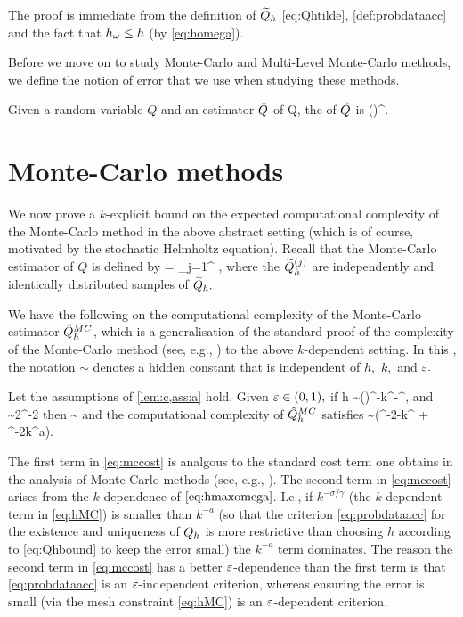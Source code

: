 The proof is immediate from the definition of $\widetilde{Q}_{h}$ \cref{eq:Qhtilde}, \cref{def:probdataacc} and the fact that $h_{\omega} \leq h$ (by \cref{eq:homega}).
\epf

Before we move on to study Monte-Carlo and Multi-Level Monte-Carlo methods, we define the notion of error that we use when studying these methods.

\label{def:rmse}
Given a random variable $Q$ and an estimator $\hat{Q}$ of Q, the  of $\hat{Q}$ is
\beqs
\err{\Qhat} \de \mleft(\mright)^{\half}.
\eeqs
\ede

\section{Monte-Carlo methods}\label{sec:mc}

We now prove a $k$-explicit bound on the expected computational complexity of the Monte-Carlo method in the above abstract setting (which is of course, motivated by the stochastic Helmholtz equation). Recall that the Monte-Carlo estimator of $Q$ is defined by
\beqs
\QhatMC =  \sum_{j=1}^{\NMC} \Qhtildesj,
\eeqs
where the $\widetilde{Q}_{h}^{(j)}$ are independently and identically distributed samples of $\widetilde{Q}_{h}.$

We have the following  on the computational complexity of the Monte-Carlo estimator $\hat{Q}^{MC}_{h}$, which is a generalisation of the standard proof of the complexity of the Monte-Carlo method (see, e.g., \cite[Section 2.1]{ClGiScTe:11}) to the above $k$-dependent setting. In this , the notation $\sim$ denotes a hidden constant that is independent of $h,$ $k,$ and $\varepsilon.$

\label{thm:hhmc}
Let the assumptions of \cref{lem:c,ass:a} hold. Given $\varepsilon \in (0,1),$ if
\beq\label{eq:hMC}
h \sim \mleft(\co\mright)^{-}k^{-\frac\sigma\alpha}\eps^{},
\eeq
and
\beq\label{eq:NMC}
\NMC  \sim 2\VAR{\Qhtilde}\eps^{-2}
\eeq
then
\beq\label{eq:mcerror}
\err{\QhatMC} \sim \eps
\eeq
and the computational complexity of $\hat{Q}^{MC}_{h}$ satisfies
\beq\label{eq:mccost}
\EXP{\CMC} \sim \VAR{\Qhtilde}\mleft(\eps^{-2-\frac{\gamma}{\alpha}}k^{\frac{\gamma\sigma}\alpha} + \eps^{-2}k^{a\gamma}\mright).
\eeq
\enth

The first term in \cref{eq:mccost} is analgous to the standard cost term one obtains in the analysis of Monte-Carlo methods (see, e.g., \cite[Section 2.1]{ClGiScTe:11}). The second term in \cref{eq:mccost} arises from the $k$-dependence of $\cref{eq:hmaxomega}$. I.e., if $k^{-\sigma/\gamma}$ (the $k$-dependent term in \cref{eq:hMC}) is smaller than $k^{-a}$ (so that the criterion \cref{eq:probdataacc} for the existence and uniqueness of $Q_{h}$ is more restrictive than choosing $h$ according to \cref{eq:Qhbound} to keep the error small) the $k^{-a}$ term dominates. The reason the second term in \cref{eq:mccost} has a better $\varepsilon$-dependence than the first term is that \cref{eq:probdataacc} is an $\varepsilon$-independent criterion, whereas ensuring the error is small (via the mesh constraint \cref{eq:hMC}) is an $\varepsilon$-dependent criterion.

